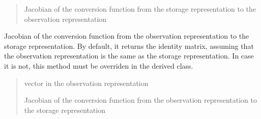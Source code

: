 \documentclass[letterpaper,10pt,english]{sphinxmanual}
\begin{document}
\begin{fulllineitems}
\begin{fulllineitems}
\begin{quote}
\begin{description}
\sphinxAtStartPar
Jacobian of the conversion function from the storage representation to the observation representation

\end{description}\end{quote}

\end{fulllineitems}


\begin{fulllineitems}
\label{\detokenize{FEKFMBLocalization:MapFeature.MapFeature.J_o2s}}
\pysigstartsignatures
{}
\pysigstopsignatures
\sphinxAtStartPar
Jacobian of the conversion function from the observation representation to the storage representation.
By default, it returns the identity matrix, assuming that the observation representation is the same as the storage representation.
In case it is not, this method must be overriden in the derived class.
\begin{quote}\begin{description}
\sphinxAtStartPar
{} \textendash{} vector in the observation representation

\sphinxAtStartPar
Jacobian of the conversion function from the observation representation to the storage representation

\end{description}\end{quote}

\end{fulllineitems}



\end{fulllineitems}
\end{document}
